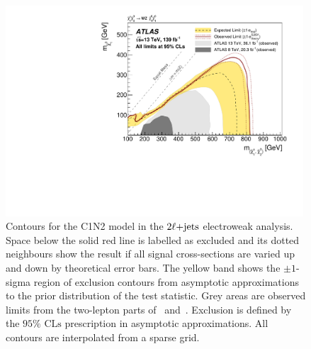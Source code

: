 \begin{figure}[tp]
\centering
\includegraphics[width=0.99\textwidth]{figures/2ljets_contours_c1n2.pdf}
\caption{%
Contours for the C1N2 model in the $2\ell\mathrm{+jets}$ electroweak analysis.
Space below the solid red line is labelled as excluded and its dotted
neighbours show the result if all signal cross-sections are varied up and down
by theoretical error bars.
The yellow band shows the $\pm1$-sigma region of exclusion contours
from asymptotic approximations to the prior distribution of the test statistic.
Grey areas are observed limits from the two-lepton parts
of~\cite{SUSY-2016-24} and~\cite{SUSY-2013-11}.
Exclusion is defined by the $95\%$ $\mathrm{CLs}$ prescription
in asymptotic approximations.
All contours are interpolated from a sparse grid.
}
\label{fig:2ljets_contours_c1n2}
\end{figure}

